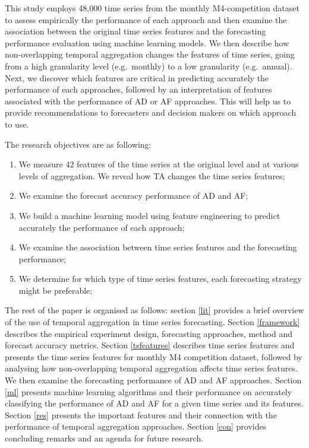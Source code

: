\documentclass[preprint, 3p,
authoryear]{elsarticle} %
\providecommand{\tightlist}{%
  \setlength{\itemsep}{0pt}\setlength{\parskip}{0pt}}
\begin{document}
This study employs 48,000 time series from the monthly M4-competition
dataset to assess empirically the performance of each approach and then
examine the association between the original time series features and
the forecasting performance evaluation using machine learning models. We
then describe how non-overlapping temporal aggregation changes the
features of time series, going from a high granularity level
(e.g.~monthly) to a low granularity (e.g.~annual). Next, we discover
which features are critical in predicting accurately the performance of
each approaches, followed by an interpretation of features associated
with the performance of AD or AF approaches. This will help us to
provide recommendations to forecasters and decision makers on which
approach to use.

The research objectives are as following:

\begin{enumerate}
\def\labelenumi{\arabic{enumi}.}
\tightlist
\item
  We measure 42 features of the time series at the original level and at
  various levels of aggregation. We reveal how TA changes the time
  series features;
\item
  We examine the forecast accuracy performance of AD and AF;
\item
  We build a machine learning model using feature engineering to predict
  accurately the performance of each approach;
\item
  We examine the association between time series features and the
  forecasting performance;
\item
  We determine for which type of time series features, each forecasting
  strategy might be preferable;
\end{enumerate}

The rest of the paper is organised as follows: section \ref{lit}
provides a brief overview of the use of temporal aggregation in time
series forecasting. Section \ref{framework} describes the empirical
experiment design, forecasting approaches, method and forecast accuracy
metrics. Section \ref{tsfeatures} describes time series features and
presents the time series features for monthly M4 competition dataset,
followed by analysing how non-overlapping temporal aggregation affects
time series features. We then examine the forecasting performance of AD
and AF approaches. Section \ref{ml} presents machine learning algorithms
and their performance on accurately classifying the performance of AD
and AF for a given time series and its features. Section \ref{res}
presents the important features and their connection with the
performance of temporal aggregation approaches. Section \ref{con}
provides concluding remarks and an agenda for future research.
\end{document}
